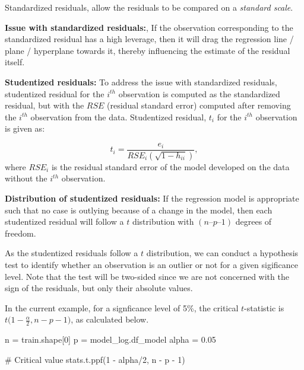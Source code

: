 \documentclass[
  letterpaper,
  DIV=11,
  numbers=noendperiod]{scrreprt}
\newenvironment{Shaded}{\begin{snugshade}}{\end{snugshade}}
\newcommand{\CommentTok}[1]{\textcolor[rgb]{0.37,0.37,0.37}{#1}}
\newcommand{\DecValTok}[1]{\textcolor[rgb]{0.68,0.00,0.00}{#1}}
\newcommand{\FloatTok}[1]{\textcolor[rgb]{0.68,0.00,0.00}{#1}}
\newcommand{\NormalTok}[1]{\textcolor[rgb]{0.00,0.23,0.31}{#1}}
\newcommand{\OperatorTok}[1]{\textcolor[rgb]{0.37,0.37,0.37}{#1}}
\begin{document}
Standardized residuals, allow the residuals to be compared on a
\emph{standard scale}.

\textbf{Issue with standardized residuals:}, If the observation
corresponding to the standardized residual has a high leverage, then it
will drag the regression line / plane / hyperplane towards it, thereby
influencing the estimate of the residual itself.

\textbf{Studentized residuals:} To address the issue with standardized
residuals, studentized residual for the \(i^{th}\) observation is
computed as the standardized residual, but with the \(RSE\) (residual
standard error) computed after removing the \(i^{th}\) observation from
the data. Studentized residual, \(t_i\) for the \(i^{th}\) observation
is given as:

\[t_i = \frac{e_i}{RSE_{i}(\sqrt{1-h_{ii}})},\] where \(RSE_{i}\) is the
residual standard error of the model developed on the data without the
\(i^{th}\) observation.

\textbf{Distribution of studentized residuals:} If the regression model
is appropriate such that no case is outlying because of a change in the
model, then each studentized residual will follow a \(t\) distribution
with \((n–p–1)\) degrees of freedom.

As the studentized residuals follow a \(t\) distribution, we can conduct
a hypothesis test to identify whether an observation is an outlier or
not for a given sigificance level. Note that the test will be two-sided
since we are not concerned with the sign of the residuals, but only
their absolute values.

In the current example, for a signficance level of 5\%, the critical
\(t\)-statistic is \(t\big(1 - \frac{\alpha}{2}, n - p - 1\big)\), as
calculated below.

\begin{Shaded}
\begin{Highlighting}[]
\NormalTok{n }\OperatorTok{=}\NormalTok{ train.shape[}\DecValTok{0}\NormalTok{]}
\NormalTok{p }\OperatorTok{=}\NormalTok{ model\_log.df\_model}
\NormalTok{alpha }\OperatorTok{=} \FloatTok{0.05}

\CommentTok{\# Critical value}
\NormalTok{stats.t.ppf(}\DecValTok{1} \OperatorTok{{-}}\NormalTok{ alpha}\OperatorTok{/}\DecValTok{2}\NormalTok{, n }\OperatorTok{{-}}\NormalTok{ p }\OperatorTok{{-}} \DecValTok{1}\NormalTok{)}
\end{Highlighting}
\end{Shaded}
\end{document}
